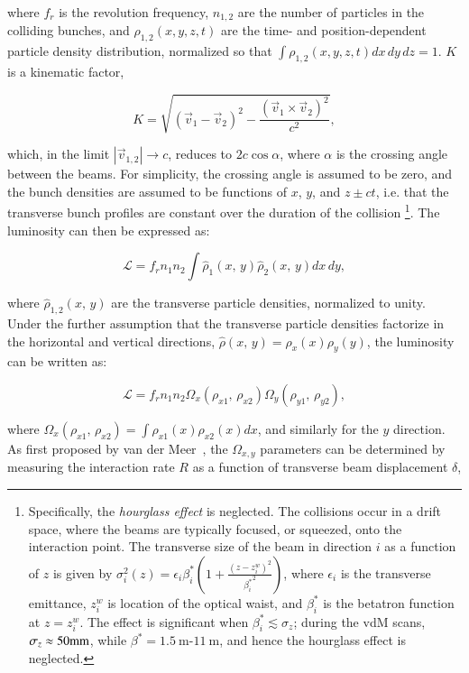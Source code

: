 where $f_r$ is the revolution frequency, $n_{1,2}$ are the number of particles in the colliding bunches, and $\rho_{1,2}(x,y,z,t)$ are the time- and position-dependent particle density distribution, normalized so that $\int \rho_{1,2}(x,y,z,t)dx\,dy\,dz = 1$. $K$ is a kinematic factor,

\begin{equation}
	K=\sqrt{(\vec{v}_1-\vec{v}_2)^2 - \frac{(\vec{v}_1\times\vec{v}_2)^2}{c^2}},
\end{equation}

which, in the limit $|\vec{v}_{1,2}|\rightarrow c$, reduces to $2c\cos\alpha$, where $\alpha$ is the crossing angle between the beams. For simplicity, the crossing angle is assumed to be zero, and the bunch densities are assumed to be functions of $x$, $y$, and $z\pm ct$, i.e. that the transverse bunch profiles are constant over the duration of the collision
\footnote{Specifically, the \emph{hourglass effect} is neglected. The collisions occur in a drift space, where the beams are typically focused, or squeezed, onto the interaction point. The transverse size of the beam in direction $i$ as a function of $z$ is given by $\sigma_{i}^2(z)=\epsilon_{i} \beta^*_{i} \left(1+\frac{(z-z_{i}^w)^2}{{\beta^*_{i}}^2}\right)$, where $\epsilon_{i}$ is the transverse emittance, $z_i^w$ is location of the optical waist, and $\beta^*_i$ is the betatron function at $z=z_i^w$. The effect is significant when $\beta^*_i\lesssim \sigma_z$; during the vdM scans, $\sigma_z\approx 50 \mathrm{mm}$, while $\beta^*=1.5~\mbox{m}$-$11~\mbox{m}$, and hence the hourglass effect is neglected.}. The luminosity can then be expressed as:

\begin{equation}
	\mathcal{L}=f_r n_1 n_2 \int \hat{\rho}_1(x,\,y)\hat{\rho}_2(x,\,y) dx\,dy,
\end{equation}

where $\hat{\rho}_{1,2}(x,\,y)$ are the transverse particle densities, normalized to unity. Under the further assumption that the transverse particle densities factorize in the horizontal and vertical directions, $\hat{\rho}(x,\,y)=\rho_x(x)\rho_y(y)$, the luminosity can be written as:

\begin{equation}
	\mathcal{L} = f_r n_1 n_2 \Omega_x(\rho_{x1},\,\rho_{x2}) \Omega_y(\rho_{y1},\,\rho_{y2}),
\end{equation}

where $\Omega_x(\rho_{x1},\,\rho_{x2})=\int \rho_{x1}(x) \rho_{x2}(x) dx$, and similarly for the $y$ direction. As first proposed by van der Meer~\cite{vdm}, the $\Omega_{x,y}$ parameters can be determined by measuring the interaction rate $R$ as a function of transverse beam displacement $\delta$,

